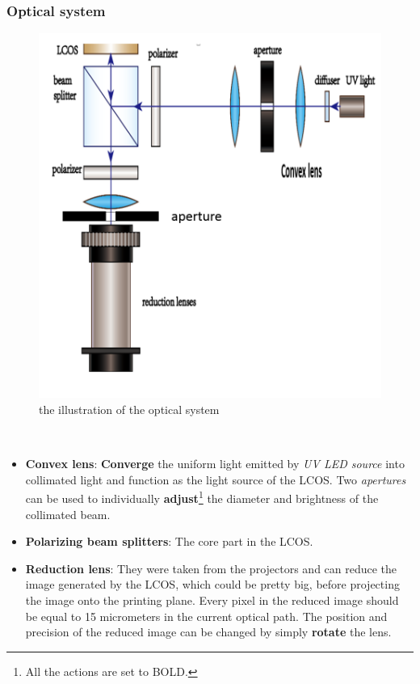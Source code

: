 \documentclass[a4paper]{article}
\begin{document}
\subsubsection{Optical system}
\begin{figure}
\centering
\includegraphics[width=\textwidth]{lightpath.PNG}
\caption{the illustration of the optical system}
\end{figure}\\
\begin{itemize}
\item \textbf{Convex lens}:
\textbf{Converge} the uniform light emitted by \textit{UV LED source} into collimated light and function as the light source of the LCOS. Two \textit{apertures} can be used to individually \textbf{adjust}\footnote{All the actions are set to BOLD.} the diameter and brightness of the collimated beam.
\item \textbf{Polarizing beam splitters}:
The core part in the LCOS.
\item \textbf{Reduction lens}:
 They were taken from the projectors and can reduce the image generated by the LCOS, which could be pretty big, before projecting the image onto the printing plane. Every pixel in the reduced image should be equal to 15 micrometers in the current optical path. The position and precision of the reduced image can be changed by simply \textbf{rotate} the lens.
\end{itemize}
\end{document}
